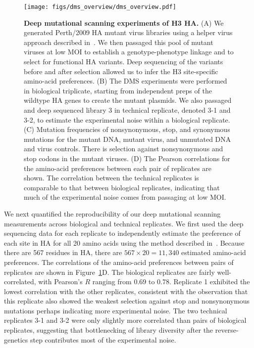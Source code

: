 \documentclass[9pt,twocolumn,twoside]{pnas-new}
\begin{document}
\begin{figure}
\centering
\texttt{[image: figs/dms\_overview/dms\_overview.pdf]}
\caption{\label{fig:dms_overview}
{\bf Deep mutational scanning experiments of H3 HA.}
(A) We generated Perth/2009 HA mutant virus libraries using a helper virus approach described in~\cite{doud2016accurate}.
We then passaged this pool of mutant viruses at low MOI to establish a genotype-phenotype linkage and to select for functional HA variants. 
Deep sequencing of the variants before and after selection allowed us to infer the H3 site-specific amino-acid preferences.
(B) The DMS experiments were performed in biological triplicate, starting from independent preps of the wildtype HA genes to create the mutant plasmids. 
We also passaged and deep sequenced library 3 in technical replicate, denoted 3-1 and 3-2, to estimate the experimental noise within a biological replicate.
(C) Mutation frequencies of nonsynonymous, stop, and synonymous mutations for the mutant DNA, mutant virus, and unmutated DNA and virus controls. 
There is selection against nonsynonymous and stop codons in the mutant viruses. 
(D) The Pearson correlations for the amino-acid preferences between each pair of replicates are shown. 
The correlation between the technical replicates is comparable to that between biological replicates, indicating that much of the experimental noise comes from passaging at low MOI. 
}
\end{figure}


We next quantified the reproducibility of our deep mutational scanning measurements across biological and technical replicates. 
We first used the deep sequencing data for each replicate to independently estimate the preference of each site in HA for all 20 amino acids using the method described in~\cite{bloom2015software}.
Because there are 567 residues in HA, there are $567 \times 20 = 11,340$ estimated amino-acid preferences.
The correlations of the amino-acid preferences between pairs of replicates are shown in Figure~\ref{fig:dms_overview}D.
The biological replicates are fairly well-correlated, with Pearson's $R$ ranging from 0.69 to 0.78. 
Replicate 1 exhibited the lowest correlation with the other replicates, consistent with the observation that this replicate also showed the weakest selection against stop and nonsynonymous mutations perhaps indicating more experimental noise.
The two technical replicates 3-1 and 3-2 were only slightly more correlated than pairs of biological replicates, suggesting that bottlenecking of library diversity after the reverse-genetics step contributes most of the experimental noise.
\end{document}
